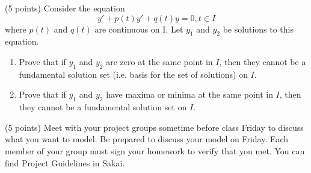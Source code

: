 \newpage


\begin{problem}[6]
(5 points) Consider the equation
\[y' +p(t)y' +q(t)y=0, t \in I\]
where $p(t)$ and $q(t)$ are continuous on I. Let $y_1$ and $y_2$ be solutions to this equation.

\begin{enumerate}
\item Prove that if $y_1$ and $y_2$ are zero at the same point in $I$, then they cannot be a fundamental
solution set (i.e. basis for the set of solutions) on $I$.
\item Prove that if $y_1$ and $y_2$ have maxima or minima at the same point in $I$, then they cannot
be a fundamental solution set on $I$.
\end{enumerate}
\end{problem}

\newpage


\begin{problem}[7]
(5 points) Meet with your project groups sometime before class Friday to discuss what you want to model. Be prepared to discuss your model on Friday. Each member of your group must sign your homework to verify that you met. You can find Project Guidelines in Sakai.
\end{problem}
